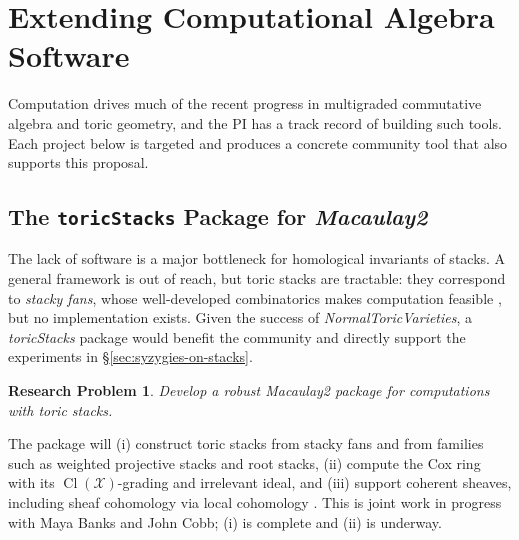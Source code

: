 \documentclass[11pt,reqno]{amsart}
\newtheorem{problem}[lemma]{Research Problem}
\theoremstyle{remark}
\newcommand{\Cl}{\operatorname{Cl}}
\newcommand{\cX}{\mathcal{X}}
\begin{document}
\section{Extending Computational Algebra Software}\label{sec:comp}
Computation drives much of the recent progress in multigraded commutative algebra and toric geometry, and the PI has a track record of building such tools. Each project below is targeted and produces a concrete community tool that also supports this proposal.

 \subsection{The \texttt{toricStacks} Package for \textit{Macaulay2}}

The lack of software is a major bottleneck for homological invariants of stacks. A general framework is out of reach, but toric stacks are tractable: they correspond to \emph{stacky fans}, whose well-developed combinatorics makes computation feasible \cite{toricStacks1,toricStacks2,borisovChenSmith05}, but no implementation exists. Given the success of \textit{NormalToricVarieties}, a \textit{toricStacks} package would benefit the community and directly support the experiments in \S\ref{sec:syzygies-on-stacks}.

\begin{problem}\label{prob:toric-stacks-m2}
Develop a robust \textit{Macaulay2} package for computations with toric stacks.
\end{problem}

The package will (i) construct toric stacks from stacky fans and from families such as weighted projective stacks and root stacks, (ii) compute the Cox ring with its $\Cl(\cX)$-grading and irrelevant ideal, and (iii) support coherent sheaves, including sheaf cohomology via local cohomology \cite{EMS00}. This is joint work in progress with Maya Banks and John Cobb; (i) is complete and (ii) is underway.

\end{document}
